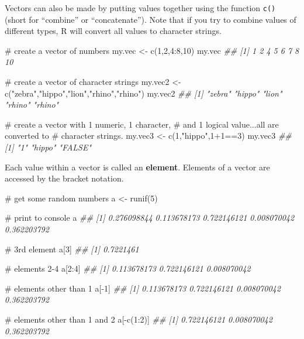 \documentclass[
  13,
  letterpaper,
]{report}
\newenvironment{Shaded}{\begin{snugshade}}{\end{snugshade}}
\newcommand{\CommentTok}[1]{\textcolor[rgb]{0.37,0.37,0.37}{#1}}
\newcommand{\DecValTok}[1]{\textcolor[rgb]{0.68,0.00,0.00}{#1}}
\newcommand{\DocumentationTok}[1]{\textcolor[rgb]{0.37,0.37,0.37}{\textit{#1}}}
\newcommand{\FunctionTok}[1]{\textcolor[rgb]{0.28,0.35,0.67}{#1}}
\newcommand{\NormalTok}[1]{\textcolor[rgb]{0.00,0.23,0.31}{#1}}
\newcommand{\OtherTok}[1]{\textcolor[rgb]{0.00,0.23,0.31}{#1}}
\newcommand{\SpecialCharTok}[1]{\textcolor[rgb]{0.37,0.37,0.37}{#1}}
\newcommand{\StringTok}[1]{\textcolor[rgb]{0.13,0.47,0.30}{#1}}
\begin{document}
Vectors can also be made by putting values together using the function
\texttt{c()} (short for ``combine'' or ``concatenate''). Note that if
you try to combine values of different types, R will convert all values
to character strings.

\begin{Shaded}
\begin{Highlighting}[]
\CommentTok{\# create a vector of numbers}
\NormalTok{my.vec }\OtherTok{\textless{}{-}} \FunctionTok{c}\NormalTok{(}\DecValTok{1}\NormalTok{,}\DecValTok{2}\NormalTok{,}\DecValTok{4}\SpecialCharTok{:}\DecValTok{8}\NormalTok{,}\DecValTok{10}\NormalTok{)}
\NormalTok{my.vec}
\DocumentationTok{\#\# [1]  1  2  4  5  6  7  8 10}

\CommentTok{\# create a vector of character strings}
\NormalTok{my.vec2 }\OtherTok{\textless{}{-}} \FunctionTok{c}\NormalTok{(}\StringTok{"zebra"}\NormalTok{,}\StringTok{"hippo"}\NormalTok{,}\StringTok{"lion"}\NormalTok{,}\StringTok{"rhino"}\NormalTok{,}\StringTok{"rhino"}\NormalTok{)}
\NormalTok{my.vec2}
\DocumentationTok{\#\# [1] "zebra" "hippo" "lion"  "rhino" "rhino"}

\CommentTok{\# create a vector with 1 numeric, 1 character,}
\CommentTok{\# and 1 logical value...all are converted to}
\CommentTok{\# character strings.}
\NormalTok{my.vec3 }\OtherTok{\textless{}{-}} \FunctionTok{c}\NormalTok{(}\DecValTok{1}\NormalTok{,}\StringTok{"hippo"}\NormalTok{,}\DecValTok{1}\SpecialCharTok{+}\DecValTok{1}\SpecialCharTok{==}\DecValTok{3}\NormalTok{)}
\NormalTok{my.vec3}
\DocumentationTok{\#\# [1] "1"     "hippo" "FALSE"}
\end{Highlighting}
\end{Shaded}

Each value within a vector is called an \textbf{element}. Elements of a
vector are accessed by the bracket notation.

\begin{Shaded}
\begin{Highlighting}[]
\CommentTok{\# get some random numbers}
\NormalTok{a }\OtherTok{\textless{}{-}} \FunctionTok{runif}\NormalTok{(}\DecValTok{5}\NormalTok{)}

\CommentTok{\# print to console}
\NormalTok{a          }
\DocumentationTok{\#\# [1] 0.276098844 0.113678173 0.722146121 0.008070042 0.362203792}

\CommentTok{\# 3rd element}
\NormalTok{a[}\DecValTok{3}\NormalTok{]       }
\DocumentationTok{\#\# [1] 0.7221461}

\CommentTok{\# elements 2{-}4}
\NormalTok{a[}\DecValTok{2}\SpecialCharTok{:}\DecValTok{4}\NormalTok{]     }
\DocumentationTok{\#\# [1] 0.113678173 0.722146121 0.008070042}

\CommentTok{\# elements other than 1}
\NormalTok{a[}\SpecialCharTok{{-}}\DecValTok{1}\NormalTok{]      }
\DocumentationTok{\#\# [1] 0.113678173 0.722146121 0.008070042 0.362203792}

\CommentTok{\# elements other than 1 and 2}
\NormalTok{a[}\SpecialCharTok{{-}}\FunctionTok{c}\NormalTok{(}\DecValTok{1}\SpecialCharTok{:}\DecValTok{2}\NormalTok{)] }
\DocumentationTok{\#\# [1] 0.722146121 0.008070042 0.362203792}
\end{Highlighting}
\end{Shaded}
\end{document}
